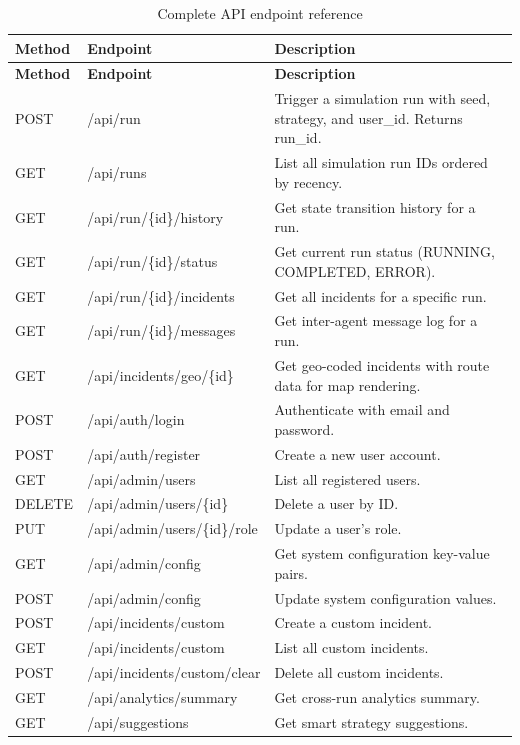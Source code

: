 \begin{longtable}{|l|l|p{6cm}|}
\caption{Complete API endpoint reference} \label{tab:api_ref} \\
\hline
\textbf{Method} & \textbf{Endpoint} & \textbf{Description} \\
\hline
\endfirsthead
\hline
\textbf{Method} & \textbf{Endpoint} & \textbf{Description} \\
\hline
\endhead
\hline
\endfoot
\hline
\endlastfoot
POST & /api/run & Trigger a simulation run with seed, strategy, and user\_id. Returns run\_id. \\
\hline
GET & /api/runs & List all simulation run IDs ordered by recency. \\
\hline
GET & /api/run/\{id\}/history & Get state transition history for a run. \\
\hline
GET & /api/run/\{id\}/status & Get current run status (RUNNING, COMPLETED, ERROR). \\
\hline
GET & /api/run/\{id\}/incidents & Get all incidents for a specific run. \\
\hline
GET & /api/run/\{id\}/messages & Get inter-agent message log for a run. \\
\hline
GET & /api/incidents/geo/\{id\} & Get geo-coded incidents with route data for map rendering. \\
\hline
POST & /api/auth/login & Authenticate with email and password. \\
\hline
POST & /api/auth/register & Create a new user account. \\
\hline
GET & /api/admin/users & List all registered users. \\
\hline
DELETE & /api/admin/users/\{id\} & Delete a user by ID. \\
\hline
PUT & /api/admin/users/\{id\}/role & Update a user's role. \\
\hline
GET & /api/admin/config & Get system configuration key-value pairs. \\
\hline
POST & /api/admin/config & Update system configuration values. \\
\hline
POST & /api/incidents/custom & Create a custom incident. \\
\hline
GET & /api/incidents/custom & List all custom incidents. \\
\hline
POST & /api/incidents/custom/clear & Delete all custom incidents. \\
\hline
GET & /api/analytics/summary & Get cross-run analytics summary. \\
\hline
GET & /api/suggestions & Get smart strategy suggestions. \\

\end{longtable}
